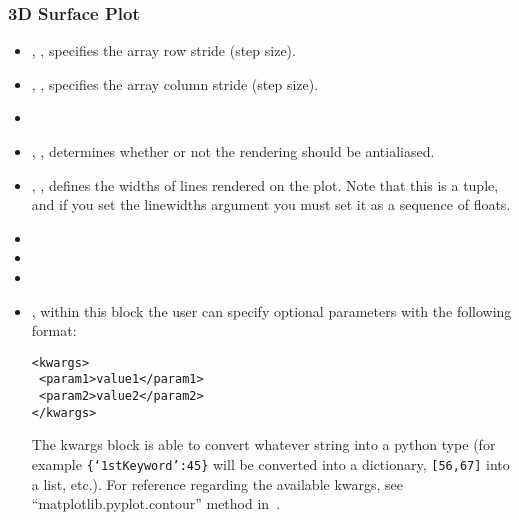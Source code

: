 \subsubsection{3D Surface Plot}
\begin{itemize}
  \item {}, , specifies the
  array row stride (step size).
  \item {}, , specifies the 
  array column stride (step size).
  \item {}
  \item {}, , determines
  whether or not the rendering should be antialiased.
  \item {}, , defines the 
  widths of lines rendered on the plot.
  Note that this is a tuple, and if you set the linewidths argument you must set
  it as a sequence of floats. 
  \item {}
  \item {}
  \item {}
  \item {}, within this block the user can specify optional
  parameters with the following format:

\begin{lstlisting}[style=XML]
<kwargs>
 <param1>value1</param1>
 <param2>value2</param2>
</kwargs>
\end{lstlisting}

  The kwargs block is able to convert whatever string into a python type (for
  example \texttt{\{`1stKeyword':45\}} will
  be converted into a dictionary, 
  \texttt{[56,67]} into a list, etc.).
  For reference regarding the available kwargs, see
  ``matplotlib.pyplot.contour'' method in~\cite{MatPlotLib}.
\end{itemize}

